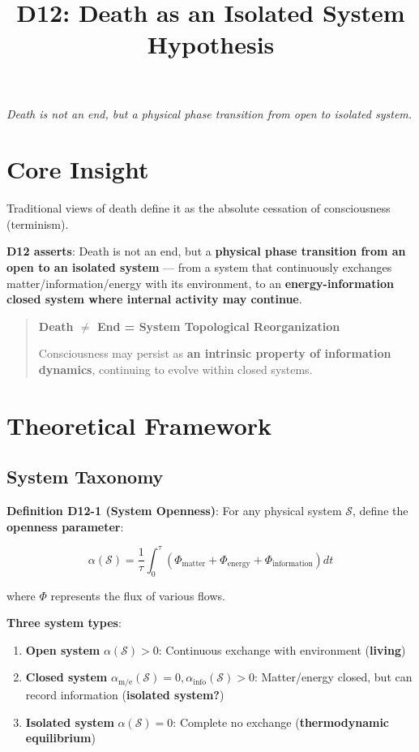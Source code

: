 \documentclass[12pt,a4paper]{article}
\title{\textbf{D12: Death as an Isolated System Hypothesis}}
\author{}
\date{}
\newcommand{\calS}{\mathcal{S}}
\newcommand{\PhiM}{\Phi_{\text{matter}}}
\newcommand{\PhiE}{\Phi_{\text{energy}}}
\newcommand{\PhiI}{\Phi_{\text{information}}}
\begin{document}
\maketitle

\begin{center}
\textit{Death is not an end, but a physical phase transition from open to isolated system.}
\end{center}

\section{Core Insight}

Traditional views of death define it as the absolute cessation of consciousness (terminism).

\textbf{D12 asserts}: Death is not an end, but a \textbf{physical phase transition from an open to an isolated system} --- from a system that continuously exchanges matter/information/energy with its environment, to an \textbf{energy-information closed system where internal activity may continue}.

\begin{quote}
\textbf{Death $\neq$ End = System Topological Reorganization}

Consciousness may persist as \textbf{an intrinsic property of information dynamics}, continuing to evolve within closed systems.
\end{quote}

\section{Theoretical Framework}

\subsection{System Taxonomy}

\textbf{Definition D12-1 (System Openness)}: For any physical system $\calS$, define the \textbf{openness parameter}:

$$\alpha(\calS) = \frac{1}{\tau} \int_{0}^{\tau} \left(\PhiM + \PhiE + \PhiI\right) dt$$

where $\Phi$ represents the flux of various flows.

\textbf{Three system types}:
\begin{enumerate}
    \item \textbf{Open system} $\alpha(\calS) > 0$: Continuous exchange with environment (\textbf{living})
    \item \textbf{Closed system} $\alpha_{\text{m/e}}(\calS) = 0, \alpha_{\text{info}}(\calS) > 0$: Matter/energy closed, but can record information (\textbf{isolated system?})
    \item \textbf{Isolated system} $\alpha(\calS) = 0$: Complete no exchange (\textbf{thermodynamic equilibrium})
\end{enumerate}
\end{document}
